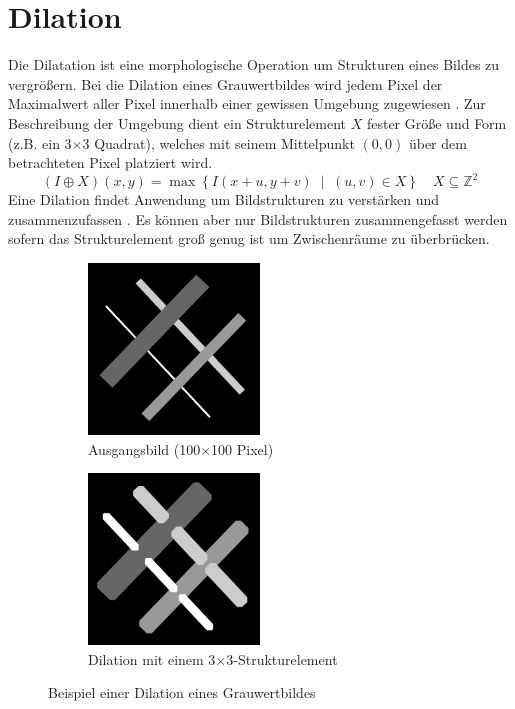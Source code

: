 \section{Dilation}
\writtenby{\dcauthornameewie}%
Die Dilatation ist eine morphologische Operation um Strukturen eines Bildes zu vergrößern.
Bei die Dilation eines Grauwertbildes wird jedem Pixel der Maximalwert aller Pixel innerhalb einer gewissen Umgebung zugewiesen \cite[3.5]{steinmueller2008}.
Zur Beschreibung der Umgebung dient ein Strukturelement $X$ fester Größe und Form (z.B. ein 3$\times$3 Quadrat), welches mit seinem Mittelpunkt $(0,0)$ über dem betrachteten Pixel platziert wird.
\begin{equation}
  (I\oplus X)(x,y)= \max \left\{ I(x+u,y+v) \;\middle|\; (u,v) \in X \right\} \quad X \subseteq \mathbb{Z}^2
\end{equation}
Eine Dilation findet Anwendung um Bildstrukturen zu verstärken und zusammenzufassen \cite[3.1]{steinmueller2008}.
Es können aber nur Bildstrukturen zusammengefasst werden sofern das Strukturelement groß genug ist um Zwischenräume zu überbrücken.

\begin{figure}[H]
  \label{fig:dilation}
  \centering
  \begin{subfigure}{0.49\linewidth}
    \centering
    \includegraphics[width=0.5\textwidth]{img/basics/dilation/before}
    \caption{Ausgangsbild (100$\times$100 Pixel)}
  \end{subfigure}
  \begin{subfigure}{0.49\linewidth}
    \centering
    \includegraphics[width=0.5\textwidth]{img/basics/dilation/after}
    \caption{Dilation mit einem 3$\times$3-Strukturelement}
  \end{subfigure}
  \caption{Beispiel einer Dilation eines Grauwertbildes}
\end{figure}
